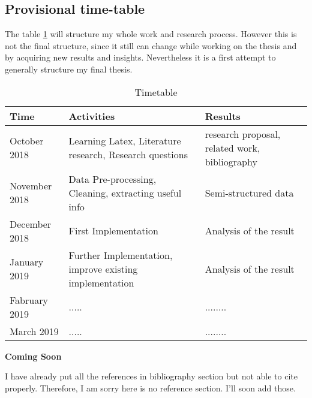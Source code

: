 \documentclass[a4paper,12pt]{article}
\begin{document}
\subsection{Provisional time-table}
The table \ref{timetable} will structure my whole work and research process. However this is not the final structure, since it still can change while working on the thesis and by acquiring new results and insights. Nevertheless it is a first attempt to generally structure my final thesis.
\begin{table}
\centering
 \caption{Timetable}
\label{timetable}
\begin{tabularx}{\textwidth}{|X|X|X|}
\hline 
\textbf{Time} & \textbf{Activities} & \textbf{Results} \\
\hline 
 October 2018 & Learning Latex, \newline 
 Literature research, \newline 
 Research questions & research proposal, \newline 
 related work, \newline 
 bibliography \\
\hline 
 November 2018 & Data Pre-processing,\newline
Cleaning,\newline
extracting useful info  &  Semi-structured data \\
\hline
 December 2018 & First Implementation & Analysis of the result \\
\hline 
January 2019 & Further Implementation,\newline
improve existing implementation & Analysis of the result \\
\hline 

 Fabruary 2019 & ..... & ........\\
\hline

 March 2019 & ..... & ........\\
\hline 
\end{tabularx}
\end{table}



\clearpage

\bigskip

\textbf{Coming Soon}

I have already put all the references in bibliography section but not able to cite properly. Therefore, I am sorry here is no reference section. I'll soon add those. 
\end{document}
